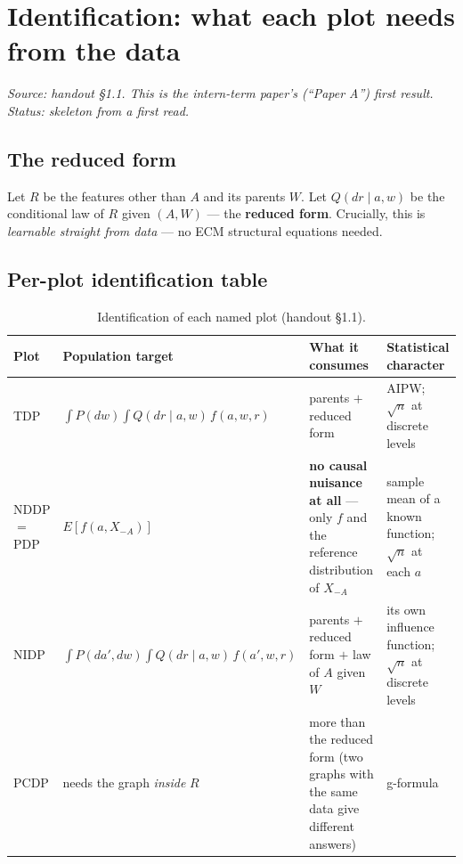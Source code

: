 \section{Identification: what each plot needs from the data}
\label{sec:identification}

\emph{Source: handout \S1.1. This is the intern-term paper's (``Paper A'')
first result. Status: skeleton from a first read.}

\subsection{The reduced form}

Let $R$ be the features other than $A$ and its parents $W$. Let
$Q(dr \mid a, w)$ be the conditional law of $R$ given $(A,W)$ --- the
\textbf{reduced form}. Crucially, this is \emph{learnable straight from
data} --- no ECM structural equations needed.

\subsection{Per-plot identification table}

\begin{table}[h]
\centering
\begin{tabular}{@{}p{2.1cm}p{4.4cm}p{3.6cm}p{3.4cm}@{}}
\toprule
\textbf{Plot} & \textbf{Population target} & \textbf{What it consumes} &
\textbf{Statistical character} \\
\midrule
TDP & $\int P(dw) \int Q(dr\mid a,w)\, f(a,w,r)$ & parents $+$ reduced form &
  AIPW; $\sqrt{n}$ at discrete levels \\
NDDP $=$ PDP & $E[f(a, X_{-A})]$ & \textbf{no causal nuisance at all} ---
  only $f$ and the reference distribution of $X_{-A}$ & sample mean of a
  known function; $\sqrt{n}$ at each $a$ \\
NIDP & $\int P(da', dw) \int Q(dr\mid a,w)\, f(a', w, r)$ & parents $+$
  reduced form $+$ law of $A$ given $W$ & its own influence function;
  $\sqrt{n}$ at discrete levels \\
PCDP & needs the graph \emph{inside} $R$ & more than the reduced form (two
  graphs with the same data give different answers) & g-formula \\
\bottomrule
\end{tabular}
\caption{Identification of each named plot (handout \S1.1).}
\label{tab:identification}
\end{table}

